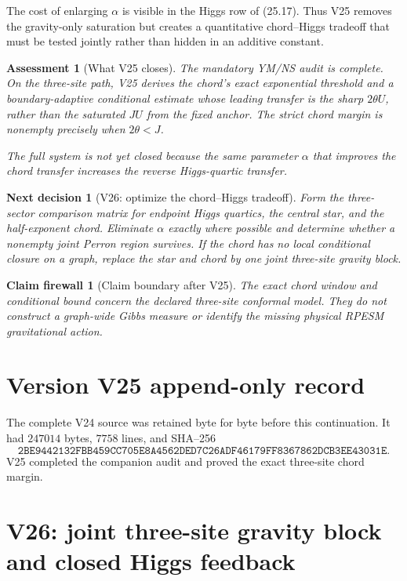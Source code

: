 \documentclass[11pt]{article}
\newtheorem{firewall}[theorem]{Claim firewall}
\newtheorem{decision}[theorem]{Next decision}
\newtheorem{assessment}[theorem]{Assessment}
\theoremstyle{remark}
\begin{document}
The cost of enlarging \(\alpha\) is visible in the Higgs row of
(25.17).  Thus V25 removes the gravity-only saturation but creates a
quantitative chord--Higgs tradeoff that must be tested jointly rather
than hidden in an additive constant.

\begin{assessment}[What V25 closes]
\label{ass:v17v25-status}
The mandatory YM/NS audit is complete.  On the three-site path, V25
derives the chord's exact exponential threshold and a boundary-adaptive
conditional estimate whose leading transfer is the sharp
\(2\theta U\), rather than the saturated \(JU\) from the fixed anchor.
The strict chord margin is nonempty precisely when \(2\theta<J\).

The full system is not yet closed because the same parameter
\(\alpha\) that improves the chord transfer increases the reverse
Higgs-quartic transfer.
\end{assessment}

\begin{decision}[V26: optimize the chord--Higgs tradeoff]
\label{dec:v17v25-next}
Form the three-sector comparison matrix for endpoint Higgs quartics,
the central star, and the half-exponent chord.  Eliminate \(\alpha\)
exactly where possible and determine whether a nonempty joint Perron
region survives.  If the chord has no local conditional closure on a
graph, replace the star and chord by one joint three-site gravity block.
\end{decision}

\begin{firewall}[Claim boundary after V25]
\label{fire:v17v25}
The exact chord window and conditional bound concern the declared
three-site conformal model.  They do not construct a graph-wide Gibbs
measure or identify the missing physical RPESM gravitational action.
\end{firewall}

\section*{Version V25 append-only record}
The complete V24 source was retained byte for byte before this
continuation.  It had \(247014\) bytes, \(7758\) lines, and SHA--256
\[
 \texttt{2BE9442132FBB459CC705E8A4562DED7C26ADF46179FF8367862DCB3EE43031E}.
\]
V25 completed the companion audit and proved the exact three-site chord
margin.


\section{V26: joint three-site gravity block and closed Higgs feedback}
\label{sec:v17v26}
\end{document}
